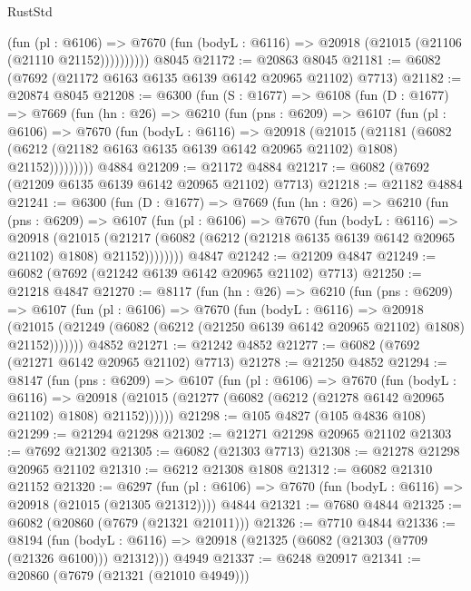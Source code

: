 \begin{lexlean}{RustStd}
\begin{coremodule}
              (fun (pl : @6106) =>
              @7670 (fun (bodyL : @6116) => @20918 (@21015 (@21106 (@21110 @21152))))))))))
    @8045
@21172 := @20863 @8045
@21181 := @6082 (@7692 (@21172 @6163 @6135 @6139 @6142 @20965 @21102) @7713)
@21182 := @20874 @8045
@21208 := @6300
    (fun (S : @1677) =>
    @6108
      (fun (D : @1677) =>
      @7669
        (fun (hn : @26) =>
        @6210
          (fun (pns : @6209) =>
          @6107
            (fun (pl : @6106) =>
            @7670
              (fun (bodyL : @6116) =>
              @20918
                (@21015
                  (@21181
                    (@6082
                      (@6212 (@21182 @6163 @6135 @6139 @6142 @20965 @21102) @1808)
                      @21152)))))))))
    @4884
@21209 := @21172 @4884
@21217 := @6082 (@7692 (@21209 @6135 @6139 @6142 @20965 @21102) @7713)
@21218 := @21182 @4884
@21241 := @6300
    (fun (D : @1677) =>
    @7669
      (fun (hn : @26) =>
      @6210
        (fun (pns : @6209) =>
        @6107
          (fun (pl : @6106) =>
          @7670
            (fun (bodyL : @6116) =>
            @20918
              (@21015
                (@21217 (@6082 (@6212 (@21218 @6135 @6139 @6142 @20965 @21102) @1808) @21152))))))))
    @4847
@21242 := @21209 @4847
@21249 := @6082 (@7692 (@21242 @6139 @6142 @20965 @21102) @7713)
@21250 := @21218 @4847
@21270 := @8117
    (fun (hn : @26) =>
    @6210
      (fun (pns : @6209) =>
      @6107
        (fun (pl : @6106) =>
        @7670
          (fun (bodyL : @6116) =>
          @20918
            (@21015 (@21249 (@6082 (@6212 (@21250 @6139 @6142 @20965 @21102) @1808) @21152)))))))
    @4852
@21271 := @21242 @4852
@21277 := @6082 (@7692 (@21271 @6142 @20965 @21102) @7713)
@21278 := @21250 @4852
@21294 := @8147
    (fun (pns : @6209) =>
    @6107
      (fun (pl : @6106) =>
      @7670
        (fun (bodyL : @6116) =>
        @20918 (@21015 (@21277 (@6082 (@6212 (@21278 @6142 @20965 @21102) @1808) @21152))))))
@21298 := @105 @4827 (@105 @4836 @108)
@21299 := @21294 @21298
@21302 := @21271 @21298 @20965 @21102
@21303 := @7692 @21302
@21305 := @6082 (@21303 @7713)
@21308 := @21278 @21298 @20965 @21102
@21310 := @6212 @21308 @1808
@21312 := @6082 @21310 @21152
@21320 := @6297
    (fun (pl : @6106) => @7670 (fun (bodyL : @6116) => @20918 (@21015 (@21305 @21312))))
    @4844
@21321 := @7680 @4844
@21325 := @6082 (@20860 (@7679 (@21321 @21011)))
@21326 := @7710 @4844
@21336 := @8194
    (fun (bodyL : @6116) => @20918 (@21325 (@6082 (@21303 (@7709 (@21326 @6100))) @21312)))
    @4949
@21337 := @6248 @20917
@21341 := @20860 (@7679 (@21321 (@21010 @4949)))

\end{coremodule}
\end{lexlean}
